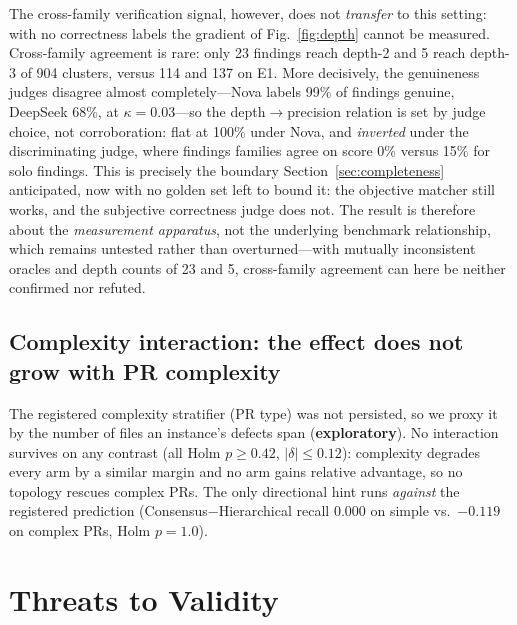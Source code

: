 \documentclass[conference]{IEEEtran}
\begin{document}
The cross-family verification signal, however, does not \emph{transfer} to this
setting: with no correctness labels the gradient of Fig.~\ref{fig:depth} cannot be
measured. Cross-family agreement is rare: only 23
findings reach depth-2 and 5 reach depth-3 of 904 clusters, versus 114 and 137 on
E1. More decisively, the genuineness judges disagree almost completely---Nova
labels 99\% of findings genuine, DeepSeek 68\%, at
$\kappa{=}0.03$---so the depth$\rightarrow$precision relation is set by judge
choice, not corroboration: flat at 100\% under Nova, and \emph{inverted} under
the discriminating judge, where findings families agree on score 0\% versus 15\%
for solo findings. This is precisely the boundary
Section~\ref{sec:completeness} anticipated, now with no golden set left to bound
it: the objective matcher still works, and the subjective correctness judge does
not. The result is therefore about the \emph{measurement apparatus}, not the
underlying benchmark relationship, which remains untested rather than
overturned---with mutually inconsistent oracles and depth counts of 23 and 5,
cross-family agreement can here be neither confirmed nor refuted.

\subsection{Complexity interaction: the effect does not grow with PR complexity}
\label{sec:rq3}
The registered complexity stratifier (PR type) was not persisted, so we proxy it
by the number of files an instance's defects span (\textbf{exploratory}). No
interaction survives on any contrast (all Holm $p{\ge}0.42$, $|\delta|{\le}0.12$):
complexity degrades every arm by a similar margin and no arm gains relative
advantage, so no topology rescues complex PRs. The only directional hint runs \emph{against} the
registered prediction (Consensus$-$Hierarchical recall $0.000$ on simple vs.\
$-0.119$ on complex PRs, Holm $p{=}1.0$).

\section{Threats to Validity}
\label{sec:threats}
\end{document}
